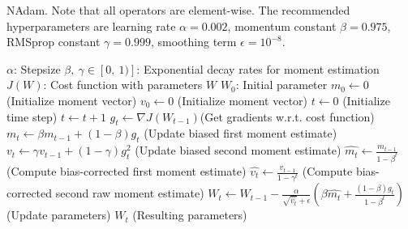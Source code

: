 \begin{algorithm}[H]
    \caption{NAdam. Note that all operators are element-wise. The recommended
    hyperparameters are learning rate $ \alpha = 0.002 $, momentum 
    constant $ \beta = 0.975 $, RMSprop constant $ \gamma = 0.999 $, 
    smoothing term $ \epsilon = 10^{-8} $.}
    \label{alg:NAdam}
    \begin{algorithmic}
    \REQUIRE $\alpha$: Stepsize
    \REQUIRE $\beta,\ \gamma \in [0,\ 1)]$: Exponential decay rates 
                for moment estimation
    \REQUIRE $J(W)$: Cost function with parameters $ W $
    \REQUIRE $W_0$: Initial parameter
    \STATE $m_0 \gets 0$ (Initialize  moment vector)
    \STATE $v_0 \gets 0$ (Initialize  moment vector)
    \STATE $t \gets 0$ (Initialize time step)
    \STATE $ t \gets t + 1 $ 
    \STATE $ g_t \gets \nabla J(W_{t-1}) $(Get gradients w.r.t. cost function)
    \STATE $ m_t \gets \beta m_{t-1} + (1-\beta)g_t $ (Update biased first moment estimate)
    \STATE $ v_t \gets \gamma v_{t-1} + (1-\gamma)g_t^2 $ (Update biased second moment estimate)
    \STATE $ \hat{m_t} \gets \frac{m_{t-1}}{1-\beta^t}$ (Compute bias-corrected first moment estimate)
    \STATE $ \hat{v_t} \gets \frac{v_{t-1}}{1-\gamma^t} $ (Compute bias-corrected second raw moment estimate)
    \STATE $ W_t \gets W_{t-1} - \frac{\alpha}{\sqrt{\hat{v_t}}+\epsilon}(\beta \hat{m_t} + \frac{(1-\beta)g_t}{1-\beta^t}) $ (Update parameters)
    \ENDWHILE
    \RETURN $ W_t $ (Resulting parameters)
    \end{algorithmic}
\end{algorithm}

\begin{comment}
    \subsubsection{Comparison}
\end{comment}